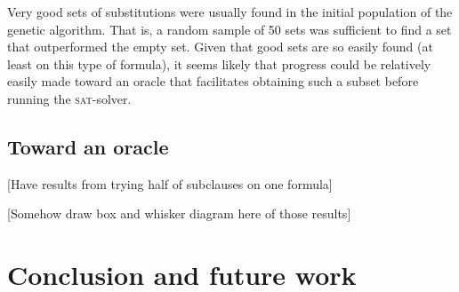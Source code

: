 \documentclass[proof,pdftex,11pt,a4,titlepage]{article}
\newcommand{\sat}{\textsc{sat}}
\begin{document}
Very good sets of substitutions were usually found in the initial population of the genetic algorithm. That is, a random sample of 50 sets was sufficient to find a set that outperformed the empty set. Given that good sets are so easily found (at least on this type of formula), it seems likely that progress could be relatively easily made toward an oracle that facilitates obtaining such a subset before running the \sat{}-solver.

\subsection{Toward an oracle}

[Have results from trying half of subclauses on one formula]

[Somehow draw box and whisker diagram here of those results]

\section{Conclusion and future work}

\FloatBarrier





\end{document}
